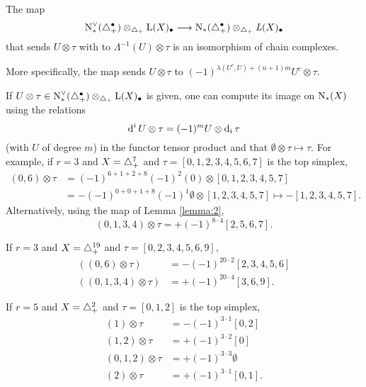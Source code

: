 \begin{lemma}\label{lemma:2} The map
	\[
	\operatorname{N}^\vee_{*}(\triangle_{+}^\bullet)\otimes_{\triangle_{+}} \operatorname{L}(X)_\bullet \longrightarrow \operatorname{N}_{*}(\triangle_{+}^\bullet)\otimes_{\triangle_{+}} \operatorname{{\it L}}(X)_\bullet
	\]
	that sends $U\otimes \tau$ with to $\Lambda^{-1}(U)\otimes \tau$ is an isomorphism of chain complexes.
\end{lemma}
More specifically, the map sends $U\otimes \tau$ to $(-1)^{\lambda(U^c,U)+(n+1)m} U^c\otimes \tau$.
\begin{example}\label{example:first3} If $U\otimes \tau\in \operatorname{N}^\vee_{*}(\triangle_{+}^\bullet)\otimes_{\triangle_{+}} \operatorname{L}(X)_\bullet$ is given, one can compute its image on $\operatorname{N}_{*}(X)$ using the relations
\[
	\operatorname{d}^i U\otimes \tau = (-1)^{m} U\otimes \operatorname{d}_i\tau
\]
 (with $U$ of degree $m$) in the functor tensor product and that $\emptyset \otimes \tau \mapsto \tau$. For example, if $r=3$ and $X=\triangle_{+}^7$ and $\tau = [0,1,2,3,4,5,6,7]$ is the top simplex,
\begin{align*}
		(0,6)\otimes \tau &= (-1)^{6+1+2+8}(-1)^2(0)\otimes [0,1,2,3,4,5,7]
		\\
		&= -(-1)^{0+0+1+8}(-1)^1\emptyset\otimes [1,2,3,4,5,7]\mapsto -[1,2,3,4,5,7].
\end{align*}
Alternatively, using the map of Lemma \ref{lemma:2},
\[
	(0,1,3,4)\otimes \tau = +(-1)^{8\cdot 4}[2,5,6,7].
\]
	\end{example}
	\begin{example}\label{example:first3'} If $r=3$ and $X=\triangle_{+}^{19}$ and $\tau = [0,2,3,4,5,6,9]$,
\begin{align*}
		((0,6)\otimes \tau) &= -(-1)^{20\cdot 2} [2,3,4,5,6]
		\\
		((0,1,3,4)\otimes \tau) &= +(-1)^{20\cdot 4}[3,6,9].
	\end{align*}
	\end{example}
	\begin{example}\label{example:first5} If $r=5$ and $X=\triangle_{+}^2$ and $\tau = [0,1,2]$ is the top simplex,
	\[
	\begin{split}
		(1)\otimes \tau &= - (-1)^{3\cdot 1} [0,2]
		\\
		(1,2)\otimes \tau &= +(-1)^{3\cdot 2} [0]
		\\
		(0,1,2)\otimes \tau &= +(-1)^{3\cdot 3}\emptyset
		\\
		(2)\otimes \tau &= +(-1)^{3\cdot 1} [0,1].
		\end{split}
	\]
	\end{example}


